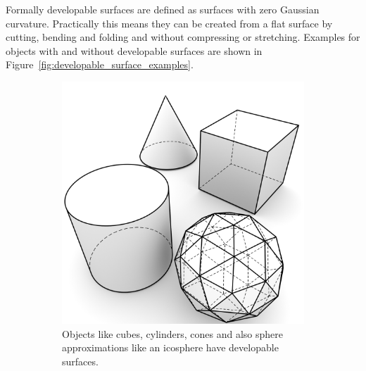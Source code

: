 \documentclass[../ClassicThesis.tex]{subfiles}
\begin{document}
Formally developable surfaces are defined as surfaces with zero Gaussian curvature. Practically this means they can be created from a flat surface by cutting, bending and folding and without compressing or stretching. Examples for objects with and without developable surfaces are shown in Figure~\ref{fig:developable_surface_examples}.

\begin{figure}[h]
  \centering
  \begin{subfigure}[b]{0.49\textwidth}
    \centering
    \includegraphics[width=\textwidth]{07-developable_surfaces}
    \caption{Objects like cubes, cylinders, cones and also sphere approximations like an icosphere have developable surfaces.}
  \end{subfigure}
  \begin{subfigure}[b]{0.49\textwidth}
    \centering

\end{subfigure}
\end{figure}
\end{document}

